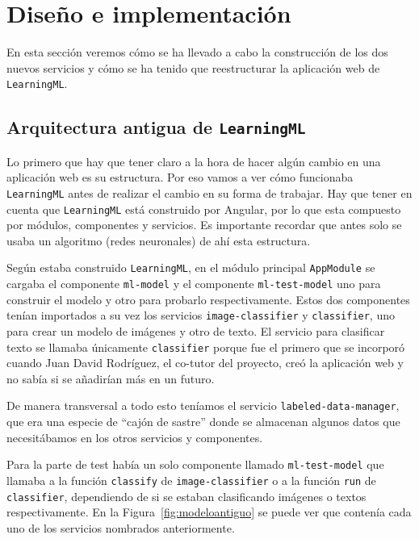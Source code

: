 \documentclass[a4paper, 12pt]{book}
\begin{document}

\cleardoublepage
\chapter{Diseño e implementación}

En esta sección veremos cómo se ha llevado a cabo la construcción de los dos nuevos servicios y cómo se ha tenido que reestructurar la aplicación web de \texttt{LearningML}.

\section{Arquitectura antigua de \texttt{LearningML}} 
\label{sec:arquitecturaantigua}

Lo primero que hay que tener claro a la hora de hacer algún cambio en una aplicación web es su estructura.
Por eso vamos a ver cómo funcionaba \texttt{LearningML} antes de realizar el cambio en su forma de trabajar. Hay que tener en cuenta que \texttt{LearningML} está construido por Angular, por lo que esta compuesto por módulos, componentes y servicios. Es importante recordar que antes solo se usaba un algoritmo (redes neuronales) de ahí esta estructura.

Según estaba construido \texttt{LearningML}, en el módulo principal \texttt{AppModule} se cargaba el componente \texttt{ml-model} y el componente \texttt{ml-test-model} uno para construir el modelo y otro para probarlo respectivamente. Estos dos componentes tenían importados a su vez los servicios \texttt{image-classifier} y \texttt{classifier}, uno para crear un modelo de imágenes y otro de texto. El servicio para clasificar texto se llamaba únicamente \texttt{classifier} porque fue el primero que se incorporó cuando Juan David Rodríguez, el co-tutor del proyecto, creó la aplicación web y no sabía si se añadirían más en un futuro.

De manera transversal a todo esto teníamos el servicio \texttt{labeled-data-manager}, que era una especie de ``cajón de sastre'' donde se almacenan algunos datos que necesitábamos en los otros servicios y componentes.

Para la parte de test había un solo componente llamado \texttt{ml-test-model} que llamaba a la función \texttt{classify} de \texttt{image-classifier} o a la función \texttt{run} de \texttt{classifier}, dependiendo de si se estaban clasificando imágenes o textos respectivamente.
En la Figura~\ref{fig:modeloantiguo} se puede ver que contenía cada uno de los servicios nombrados anteriormente.
\end{document}
